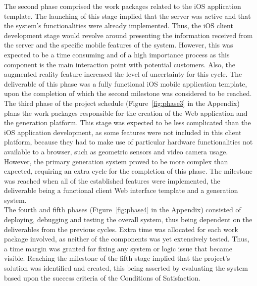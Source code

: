 The second phase comprised the work packages related to the iOS application template. The launching of this stage implied that the server was active and that the system's functionalities were already implemented. Thus, the iOS client development stage would revolve around presenting the information received from the server and the specific mobile features of the system. However, this was expected to be a time consuming and of a high importance process as this component is the main interaction point with potential customers. Also, the augmented reality feature increased the level of uncertainty for this cycle. The deliverable of this phase was a fully functional iOS mobile application template, upon the completion of which the second milestone was considered to be reached.\\

The third phase of the project schedule (Figure~\ref{fig:phase3} in the Appendix) plans the work packages responsible for the creation of the Web application and the generation platform. This stage was expected to be less complicated than the iOS application development, as some features were not included in this client platform, because they had to make use of particular hardware functionalities not available to a browser, such as geometric sensors and video camera usage. However, the primary generation system proved to be more complex than expected, requiring an extra cycle for the completion of this phase. The milestone was reached when all of the established features were implemented, the deliverable being a functional client Web interface template and a generation system.\\

The fourth and fifth phases (Figure~\ref{fig:phase4} in the Appendix) consisted of deploying, debugging and testing the overall system, thus being dependent on the deliverables from the previous cycles. Extra time was allocated for each work package involved, as neither of the components was yet extensively tested. Thus, a time margin was granted for fixing any system or logic issue that became visible. Reaching the milestone of the fifth stage implied that the project's solution was identified and created, this being asserted by evaluating the system based upon the success criteria of the Conditions of Satisfaction.

